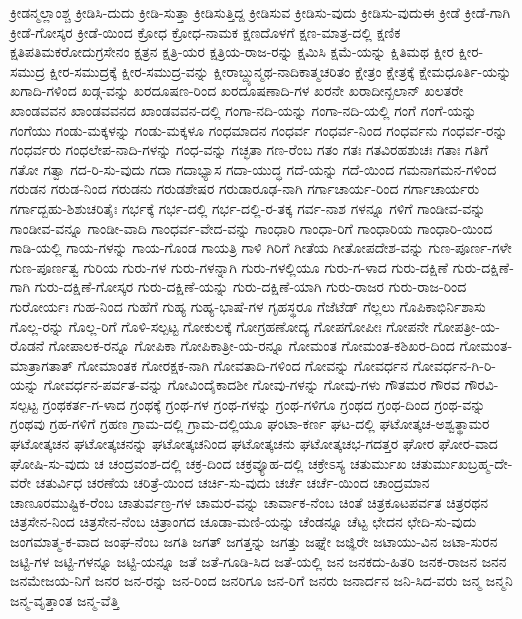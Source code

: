 ಕ್ರೀಡನ್ಮಲ್ಲಾಂಶ್ಚ
ಕ್ರೀಡಿಸಿ-ದುದು
ಕ್ರೀಡಿ-ಸುತ್ತಾ
ಕ್ರೀಡಿಸುತ್ತಿದ್ದ
ಕ್ರೀಡಿಸುವ
ಕ್ರೀಡಿಸು-ವುದು
ಕ್ರೀಡಿಸು-ವುದುಈ
ಕ್ರೀಡೆ
ಕ್ರೀಡೆ-ಗಾಗಿ
ಕ್ರೀಡೆ-ಗೋಸ್ಕರ
ಕ್ರೀಡೆ-ಯಿಂದ
ಕ್ರೋಧ
ಕ್ರೋಧ-ನಾಮಕ
ಕ್ಷಣದೊಳಗೆ
ಕ್ಷಣ-ಮಾತ್ರ-ದಲ್ಲಿ
ಕ್ಷಣಿಕ
ಕ್ಷತಿಪತಿಮಕರೋದುಗ್ರಸೇನಂ
ಕ್ಷತ್ರನ
ಕ್ಷತ್ರಿ-ಯರ
ಕ್ಷತ್ರಿಯ-ರಾಜ-ರನ್ನು
ಕ್ಷಮಿಸಿ
ಕ್ಷಮೆ-ಯನ್ನು
ಕ್ಷಿತಿಮಥ
ಕ್ಷೀರ
ಕ್ಷೀರ-ಸಮುದ್ರ
ಕ್ಷೀರ-ಸಮುದ್ರಕ್ಕೆ
ಕ್ಷೀರ-ಸಮುದ್ರ-ವನ್ನು
ಕ್ಷೀರಾಬ್ದ್ಯುನ್ಮಥ-ನಾದಿಕಾತ್ಮಚರಿತಂ
ಕ್ಷೇತ್ರಂ
ಕ್ಷೇತ್ರಕ್ಕೆ
ಕ್ಷೇಮಧೂರ್ತಿ-ಯನ್ನು
ಖಗಾದಿ-ಗಳಿಂದ
ಖಡ್ಗ-ವನ್ನು
ಖರದೂಷಣ-ರಿಂದ
ಖರದೂಷಣಾದಿ-ಗಳ
ಖರನೇ
ಖರಾದೀನ್ಖಲಾನ್
ಖಲತರೇ
ಖಾಂಡವವನ
ಖಾಂಡವವನದ
ಖಾಂಡವವನ-ದಲ್ಲಿ
ಗಂಗಾ-ನದಿ-ಯನ್ನು
ಗಂಗಾ-ನದಿ-ಯಲ್ಲಿ
ಗಂಗೆ
ಗಂಗೆ-ಯನ್ನು
ಗಂಗೆಯು
ಗಂಡು-ಮಕ್ಕಳನ್ನು
ಗಂಡು-ಮಕ್ಕಳೂ
ಗಂಧಮಾದನ
ಗಂಧರ್ವ
ಗಂಧರ್ವ-ನಿಂದ
ಗಂಧರ್ವನು
ಗಂಧರ್ವ-ರನ್ನು
ಗಂಧರ್ವರು
ಗಂಧಲೇಪ-ನಾದಿ-ಗಳನ್ನು
ಗಂಧ-ವನ್ನು
ಗಚ್ಛತಾ
ಗಣ-ರೆಂಬ
ಗತಂ
ಗತಃ
ಗತವಿರಹಶುಚಃ
ಗತಾಃ
ಗತಿಗೆ
ಗತೋ
ಗತ್ವಾ
ಗದ-ರಿ-ಸು-ವುದು
ಗದಾ
ಗದಾಭ್ಯಾಸ
ಗದಾ-ಯುದ್ಧ
ಗದೆ-ಯನ್ನು
ಗದೆ-ಯಿಂದ
ಗಮನಾಗಮನ-ಗಳಿಂದ
ಗರುಡನ
ಗರುಡ-ನಿಂದ
ಗರುಡನು
ಗರುಡಶೇಷರ
ಗರುಡಾರೂಢ-ನಾಗಿ
ಗರ್ಗಾಚಾರ್ಯ-ರಿಂದ
ಗರ್ಗಾಚಾರ್ಯರು
ಗರ್ಗಾದ್ಬಹು-ಶಿಶುಚರಿತೈಃ
ಗರ್ಭಕ್ಕೆ
ಗರ್ಭ-ದಲ್ಲಿ
ಗರ್ಭ-ದಲ್ಲಿ-ರ-ತಕ್ಕ
ಗರ್ವ-ನಾಶ
ಗಳನ್ನೂ
ಗಳಿಗೆ
ಗಾಂಡೀವ-ವನ್ನು
ಗಾಂಡೀವ-ವನ್ನೂ
ಗಾಂಡೀ-ವಾದಿ
ಗಾಂಧರ್ವ-ವೇದ-ವನ್ನು
ಗಾಂಧಾರಿ
ಗಾಂಧಾ-ರಿಗೆ
ಗಾಂಧಾರಿಯ
ಗಾಂಧಾರಿ-ಯಿಂದ
ಗಾಡಿ-ಯಲ್ಲಿ
ಗಾಯ-ಗಳನ್ನು
ಗಾಯ-ಗೊಂಡ
ಗಾಯತ್ರಿ
ಗಾಳಿ
ಗಿರಿಗೆ
ಗೀತೆಯ
ಗೀತೋಪದೇಶ-ವನ್ನು
ಗುಣ-ಪೂರ್ಣ-ಗಳೇ
ಗುಣ-ಪೂರ್ಣತ್ವ
ಗುರಿಯ
ಗುರು-ಗಳ
ಗುರು-ಗಳನ್ನಾಗಿ
ಗುರು-ಗಳಲ್ಲಿಯೂ
ಗುರು-ಗ-ಳಾದ
ಗುರು-ದಕ್ಷಿಣೆ
ಗುರು-ದಕ್ಷಿಣೆ-ಗಾಗಿ
ಗುರು-ದಕ್ಷಿಣೆ-ಗೋಸ್ಕರ
ಗುರು-ದಕ್ಷಿಣೆ-ಯನ್ನು
ಗುರು-ದಕ್ಷಿಣೆ-ಯಾಗಿ
ಗುರು-ರಾಜರ
ಗುರು-ರಾಜ-ರಿಂದ
ಗುರೋರ್ಯಃ
ಗುಹ-ನಿಂದ
ಗುಹೆಗೆ
ಗುಹ್ಯ
ಗುಹ್ಯ-ಭಾಷೆ-ಗಳ
ಗೃಹಸ್ಥರೂ
ಗೆಜೆಟೆಡ್
ಗೆಲ್ಲಲು
ಗೊಪಿಕಾಭಿರ್ನಿಶಾಸು
ಗೊಲ್ಲ-ರನ್ನು
ಗೊಲ್ಲ-ರಿಗೆ
ಗೊಳಿ-ಸಲ್ಪಟ್ಟ
ಗೋಕುಲಕ್ಕೆ
ಗೋಗ್ರಹಣೋದ್ಯ
ಗೋಪಗೋಪೀಃ
ಗೋಪನೇ
ಗೋಪತ್ರೀ-ಯ-ರೊಡನೆ
ಗೋಪಾಲಕ-ರನ್ನೂ
ಗೋಪಿಕಾ
ಗೋಪಿಕಾತ್ರೀ-ಯ-ರನ್ನೂ
ಗೋಮಂತ
ಗೋಮಂತ-ಕಶಿಖರ-ದಿಂದ
ಗೋಮಂತ-ಮಾತ್ರಾಗತಾತ್
ಗೋಮಾಂತಕ
ಗೋರಕ್ಷಕ-ನಾಗಿ
ಗೋವತಾದಿ-ಗಳಿಂದ
ಗೋವನ್ನು
ಗೋವರ್ಧನ
ಗೋವರ್ಧನ-ಗಿ-ರಿ-ಯನ್ನು
ಗೋವರ್ಧನ-ಪರ್ವತ-ವನ್ನು
ಗೋವಿಂದೈಕಾದಶೀ
ಗೋವು-ಗಳನ್ನು
ಗೋವು-ಗಳು
ಗೌತಮರ
ಗೌರವ
ಗೌರವಿ-ಸಲ್ಪಟ್ಟ
ಗ್ರಂಥಕರ್ತ-ಗ-ಳಾದ
ಗ್ರಂಥಕ್ಕೆ
ಗ್ರಂಥ-ಗಳ
ಗ್ರಂಥ-ಗಳನ್ನು
ಗ್ರಂಥ-ಗಳಿಗೂ
ಗ್ರಂಥದ
ಗ್ರಂಥ-ದಿಂದ
ಗ್ರಂಥ-ವನ್ನು
ಗ್ರಂಥವು
ಗ್ರಹ-ಗಳಿಗೆ
ಗ್ರಹಣ
ಗ್ರಾಮ-ದಲ್ಲಿ
ಗ್ರಾಮ-ದಲ್ಲಿಯೂ
ಘಂಟಾ-ಕರ್ಣ
ಘಟ-ದಲ್ಲಿ
ಘಟೋತ್ಕಚ-ಅಶ್ವತ್ಥಾಮರ
ಘಟೋತ್ಕಚನ
ಘಟೋತ್ಕಚನನ್ನು
ಘಟೋತ್ಕಚನಿಂದ
ಘಟೋತ್ಕಚನು
ಘಟೋತ್ಕಚಭ-ಗದತ್ತರ
ಘೋರ
ಘೋರ-ವಾದ
ಘೋಷಿ-ಸು-ವುದು
ಚ
ಚಂದ್ರವಂಶ-ದಲ್ಲಿ
ಚಕ್ರ-ದಿಂದ
ಚಕ್ರವ್ಯೂಹ-ದಲ್ಲಿ
ಚಕ್ರೇಽಸ್ಯ
ಚತುರ್ಮುಖ
ಚತುರ್ಮುಖಬ್ರಹ್ಮ-ದೇ-ವರೇ
ಚತುರ್ವಿಧ
ಚರಣೆಯ
ಚರಿತ್ರೆ-ಯಿಂದ
ಚರ್ಚಿ-ಸು-ವುದು
ಚರ್ಚೆ
ಚರ್ಚೆ-ಯಿಂದ
ಚಾಂದ್ರಮಾನ
ಚಾಣೂರಮುಷ್ಟಿಕ-ರೆಂಬ
ಚಾತುರ್ವಣ್ರ-ಗಳ
ಚಾಮರ-ವನ್ನು
ಚಾರ್ವಾಕ-ನೆಂಬ
ಚಿಂತೆ
ಚಿತ್ರಕೂಟಪರ್ವತ
ಚಿತ್ರರಥನ
ಚಿತ್ರಸೇನ-ನಿಂದ
ಚಿತ್ರಸೇನ-ನೆಂಬ
ಚಿತ್ರಾಂಗದ
ಚೂಡಾ-ಮಣಿ-ಯನ್ನು
ಚೆಂಡನ್ನೂ
ಚೆಟ್ಟ
ಛೇದನ
ಛೇದಿ-ಸು-ವುದು
ಜಂಗಮಾತ್ಮ-ಕ-ವಾದ
ಜಂಘ-ನೆಂಬ
ಜಗತಿ
ಜಗತ್
ಜಗತ್ತನ್ನು
ಜಗತ್ತು
ಜಘ್ನೇ
ಜಜ್ಞಿರೇ
ಜಟಾಯು-ವಿನ
ಜಟಾ-ಸುರನ
ಜಟ್ಟಿ-ಗಳ
ಜಟ್ಟಿ-ಗಳನ್ನೂ
ಜಟ್ಟಿ-ಯನ್ನೂ
ಜತೆ
ಜತೆ-ಗೂಡಿ-ಸಿದ
ಜತೆ-ಯಲ್ಲಿ
ಜನ
ಜನಕದು-ಹಿತರಿ
ಜನಕ-ರಾಜನ
ಜನನ
ಜನಮೇಜಯ-ನಿಗೆ
ಜನರ
ಜನ-ರನ್ನು
ಜನ-ರಿಂದ
ಜನರಿಗೂ
ಜನ-ರಿಗೆ
ಜನರು
ಜನಾರ್ದನ
ಜನಿ-ಸಿದ-ವರು
ಜನ್ಮ
ಜನ್ಮನಿ
ಜನ್ಮ-ವೃತ್ತಾಂತ
ಜನ್ಮ-ವೆತ್ತಿ
